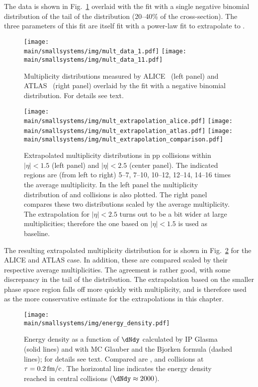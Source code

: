 \documentclass[../report.tex]{subfiles}
\providecommand{\main}{..}
\begin{document}
The data is shown in Fig.~\ref{fig:smallsystems_mult_data} overlaid with the fit with a single negative binomial distribution of the tail of the distribution (20--40\% of the cross-section). The three parameters of this fit are itself fit with a power-law fit to extrapolate to \unit[14]{\UTeV}.

\begin{figure}[t]
\centering
\texttt{[image: \\main/smallsystems/img/mult\_data\_1.pdf]}
\hfill
\texttt{[image: \\main/smallsystems/img/mult\_data\_11.pdf]}
\caption{Multiplicity distributions measured by ALICE~\cite{Adam:2015gka} (left panel) and ATLAS~\cite{Aad:2010ac,Aad:2016xww} (right panel) overlaid by the fit with a negative binomial distribution. For details see text.}
\label{fig:smallsystems_mult_data}
\end{figure}

\begin{figure}[t]
\centering
\texttt{[image: \\main/smallsystems/img/mult\_extrapolation\_alice.pdf]}
\texttt{[image: \\main/smallsystems/img/mult\_extrapolation\_atlas.pdf]}
\texttt{[image: \\main/smallsystems/img/mult\_extrapolation\_comparison.pdf]}
\caption{Extrapolated multiplicity distributions in pp collisions within $|\eta| < 1.5$ (left panel) and $|\eta| < 2.5$ (center panel). The indicated regions are (from left to right) 5--7, 7--10, 10--12, 12--14, 14--16 times the average multiplicity. In the left panel the multiplicity distribution of \PbPb and \pPb collisions is also plotted. The right panel compares these two distributions scaled by the average multiplicity. The extrapolation for $|\eta| < 2.5$ turns out to be a bit wider at large multiplicities; therefore the one based on $|\eta| < 1.5$ is used as baseline.}
\label{fig:smallsystems_mult_extrapolation}
\end{figure}

The resulting extrapolated multiplicity distribution for \unit[14]{\UTeV} is shown in Fig.~\ref{fig:smallsystems_mult_extrapolation} for the ALICE and ATLAS case. In addition, these are compared scaled by their respective average multiplicities. The agreement is rather good, with some discrepancy in the tail of the distribution. The extrapolation based on the smaller phase space region falls off more quickly with multiplicity, and is therefore used as the more conservative estimate for the extrapolations in this chapter.

\begin{figure}[t]
\centering
\texttt{[image: \\main/smallsystems/img/energy\_density.pdf]}
\caption{Energy density as a function of $\dNdy$ calculated by IP Glasma (solid lines) and with MC Glauber and the Bjorken formula (dashed lines); for details see text. Compared are \pp, \pPb and \PbPb collisions at $\tau = \unit[0.2]{fm/c}$. The horizontal line indicates the energy density reached in central \PbPb collisions ($\dNdy \approx 2000$).}
\label{fig:small_systems_energy_density}
\end{figure}
\end{document}

